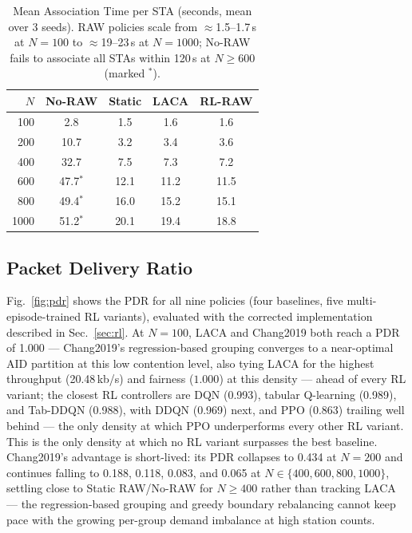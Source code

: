 \documentclass[conference]{IEEEtran}
\begin{document}
\begin{table}[t]
\centering
\caption{Mean Association Time per STA (seconds, mean over 3 seeds).
  RAW policies scale from $\approx$1.5–1.7\,s at $N=100$ to
  $\approx$19–23\,s at $N=1000$; No-RAW fails to associate all STAs
  within 120\,s at $N\!\geq\!600$ (marked $^*$).}
\label{tab:assoc}
\setlength{\tabcolsep}{3pt}
{\scriptsize
\begin{tabular}{r cccc}
\toprule
$N$ & No-RAW & Static & LACA & RL-RAW \\
\midrule
 100 &  2.8        & 1.5 & 1.6 & 1.6 \\
 200 & 10.7        & 3.2 & 3.4 & 3.6 \\
 400 & 32.7        & 7.5 & 7.3 & 7.2 \\
 600 & 47.7$^*$   & 12.1 & 11.2 & 11.5 \\
 800 & 49.4$^*$   & 16.0 & 15.2 & 15.1 \\
1000 & 51.2$^*$   & 20.1 & 19.4 & 18.8 \\
\bottomrule
\end{tabular}
}
\end{table}

\subsection{Packet Delivery Ratio}

Fig.~\ref{fig:pdr} shows the PDR for all nine policies (four baselines,
five multi-episode-trained RL variants), evaluated with the corrected
implementation described in Sec.~\ref{sec:rl}.
At $N = 100$, LACA and Chang2019 both reach a PDR of 1.000 — Chang2019's
regression-based grouping converges to a near-optimal AID partition at this
low contention level, also tying LACA for the highest throughput
(20.48\,kb/s) and fairness ($1.000$) at this density — ahead of every RL
variant; the closest RL controllers are DQN (0.993), tabular Q-learning
(0.989), and Tab-DDQN (0.988), with DDQN (0.969) next, and PPO (0.863)
trailing well behind — the only density at which PPO underperforms every
other RL variant.
This is the only density at which no RL variant surpasses the best baseline.
Chang2019's advantage is short-lived: its PDR collapses to 0.434 at
$N = 200$ and continues falling to 0.188, 0.118, 0.083, and 0.065 at
$N\in\{400,600,800,1000\}$, settling close to Static RAW/No-RAW for
$N\geq400$ rather than tracking LACA — the regression-based grouping and
greedy boundary rebalancing cannot keep pace with the growing per-group
demand imbalance at high station counts.
\end{document}
